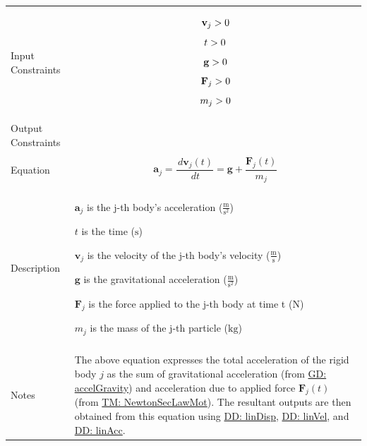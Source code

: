 \documentclass[12pt]{article}
\newcommand{\gt}{\ensuremath >}
\begin{document}
\begin{minipage}{\textwidth}
\begin{tabular}{>{\raggedright}p{}>{\raggedright\arraybackslash}p{}}
\\ \midrule \\
Input Constraints & \begin{displaymath}
                    {\mathbf{v}_{j}}\gt{}0
                    \end{displaymath}
                    \begin{displaymath}
                    t\gt{}0
                    \end{displaymath}
                    \begin{displaymath}
                    \mathbf{g}\gt{}0
                    \end{displaymath}
                    \begin{displaymath}
                    {\mathbf{F}_{j}}\gt{}0
                    \end{displaymath}
                    \begin{displaymath}
                    {m_{j}}\gt{}0
                    \end{displaymath}
\\ \midrule \\
Output Constraints & 
\\ \midrule \\
Equation & \begin{displaymath}
           {\mathbf{a}_{j}}=\frac{\,d{\mathbf{v}_{j}}\left(t\right)}{\,dt}=\mathbf{g}+\frac{{\mathbf{F}_{j}}\left(t\right)}{{m_{j}}}
           \end{displaymath}
\\ \midrule \\
Description & \begin{symbDescription}
              \item{${\mathbf{a}_{j}}$ is the j-th body's acceleration ($\frac{\text{m}}{\text{s}^{2}}$)}
              \item{$t$ is the time (${\text{s}}$)}
              \item{${\mathbf{v}_{j}}$ is the velocity of the j-th body's velocity ($\frac{\text{m}}{\text{s}}$)}
              \item{$\mathbf{g}$ is the gravitational acceleration ($\frac{\text{m}}{\text{s}^{2}}$)}
              \item{${\mathbf{F}_{j}}$ is the force applied to the j-th body at time t (${\text{N}}$)}
              \item{${m_{j}}$ is the mass of the j-th particle (${\text{kg}}$)}
              \end{symbDescription}
\\ \midrule \\
Notes & The above equation expresses the total acceleration of the rigid body $j$ as the sum of gravitational acceleration (from \hyperref[GD:accelGravity]{GD: accelGravity}) and acceleration due to applied force ${\mathbf{F}_{j}}\left(t\right)$ (from \hyperref[TM:NewtonSecLawMot]{TM: NewtonSecLawMot}). The resultant outputs are then obtained from this equation using \hyperref[DD:linDisp]{DD: linDisp}, \hyperref[DD:linVel]{DD: linVel}, and \hyperref[DD:linAcc]{DD: linAcc}.
        

\end{tabular}
\end{minipage}
\end{document}
